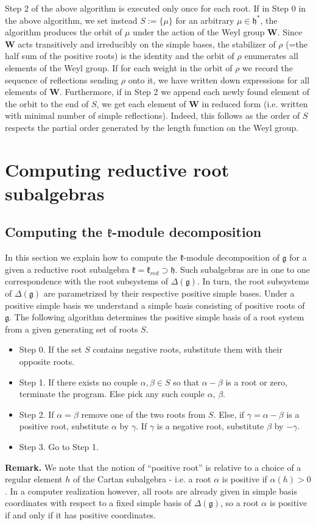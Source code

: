 \documentclass[12pt]{report}
\newcommand{\WW}{\mathbf{W}}
\newcommand{\kk}{\mathfrak{k}}
\newcommand{\hh}{\mathfrak{h}}
\newcommand{\gG}{\mathfrak{g}}
\begin{document}
Step 2 of the above algorithm is executed only once for each root. If in Step 0 in the above algorithm, we set instead $S:=\{\mu\}$ for an arbitrary $\mu\in\hh^*$, the algorithm produces the orbit of $\mu$ under the action of the Weyl group $\WW$. Since $\WW$ acts transitively and irreducibly on the simple bases, the stabilizer of $\rho$ (=the half sum of the positive roots) is the identity and the orbit of $\rho$ enumerates all elements of the Weyl group. If for each weight in the orbit of $\rho$ we record the sequence of reflections sending $\rho$ onto it, we have written down expressions for all elements of $\WW$. Furthermore, if in Step 2 we append each newly found element of the orbit to the end of $S$, we get each element of $\WW$ in reduced form (i.e. written with minimal number of simple reflections). Indeed, this follows as the order of $S$ respects the partial order generated by the length function on the Weyl group.
\section{Computing reductive root subalgebras}
\subsection{Computing the $\kk$-module decomposition}\label{secComputingKmods}
In this section we explain how to compute the $\kk$-module decomposition of $\gG$ for a given a reductive root subalgebra $\kk=\kk_{red}\supset\hh$. Such subalgebras are in one to one correspondence with the root subsystems of $\Delta(\gG)$. In turn, the root subsystems of $\Delta(\gG)$ are parametrized by their respective positive simple bases. Under a positive simple basis we understand a simple basis consisting of positive roots of $\gG$. The following algorithm determines the positive simple basis of a root system from a given generating set of roots $S$. %
\begin{itemize}
\item Step 0. If the set $S$ contains negative roots, substitute them with their opposite roots.
\item Step 1. If there exists no couple $\alpha,\beta\in S$ so that $\alpha-\beta$ is a root or zero, terminate the program. Else pick any such couple $\alpha$, $\beta$.
\item Step 2. If $\alpha=\beta$ remove one of the two roots from $S$. Else, if $\gamma=\alpha-\beta$ is a positive root, substitute $\alpha$ by $\gamma$. If $\gamma$ is a negative root, substitute $\beta$ by $-\gamma$.
\item Step 3. Go to Step 1.
\end{itemize}
\textbf{Remark.} We note that the notion of ``positive root'' is relative to a choice of a regular element $h$ of the Cartan subalgebra - i.e. a root $\alpha $ is positive if $\alpha(h)>0$. In a computer realization however, all roots are already given in simple basis coordinates with respect to a fixed simple basis of $\Delta(\gG)$, so a root $\alpha$ is positive if and only if it has positive coordinates.
\end{document}
